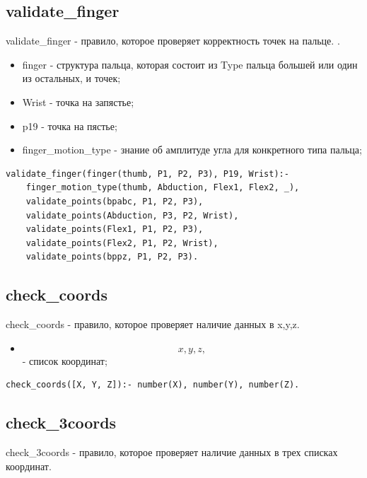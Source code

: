 \subsection{validate\_finger}
\hspace{0.6cm} validate\_finger - правило, которое проверяет корректность точек на пальце. .

\begin{itemize}
	\item finger - структура пальца, которая состоит из Type пальца большей или один из остальных, и точек;
	\item Wrist - точка на запястье;
	\item p19 - точка на пястье;
	\item finger\_motion\_type - знание об амплитуде угла для конкретного типа пальца;
\end{itemize}

\begin{lstlisting}[caption=Реализация правила validate\_finger, label=rules:validatefinger]
validate_finger(finger(thumb, P1, P2, P3), P19, Wrist):-
	finger_motion_type(thumb, Abduction, Flex1, Flex2, _),
	validate_points(bpabc, P1, P2, P3),
	validate_points(Abduction, P3, P2, Wrist),
	validate_points(Flex1, P1, P2, P3),
	validate_points(Flex2, P1, P2, Wrist),
	validate_points(bppz, P1, P2, P3).
\end{lstlisting}

\subsection{check\_coords}
\hspace{0.6cm} check\_coords - правило, которое проверяет наличие данных в x,y,z.

\begin{itemize}
	\item \[x,y,z,\] - список координат;
\end{itemize}

\begin{lstlisting}[caption=Реализация правила check\_coords, label=rules:checkcoords]
check_coords([X, Y, Z]):- number(X), number(Y), number(Z).
\end{lstlisting}

\subsection{check\_3coords}
\hspace{0.6cm} check\_3coords - правило, которое проверяет наличие данных в трех списках координат.

